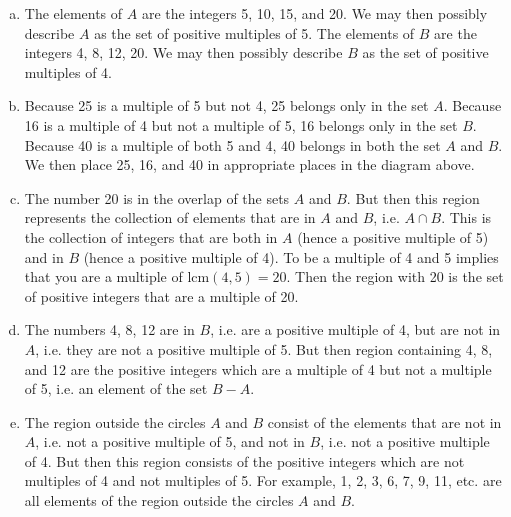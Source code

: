 \documentclass[11pt,letterpaper]{article}
\begin{document}
\sol 
\begin{enumerate}[(a)]
\item The elements of $A$ are the integers 5, 10, 15, and 20. We may then possibly describe $A$ as the set of positive multiples of 5. The elements of $B$ are the integers 4, 8, 12, 20. We may then possibly describe $B$ as the set of positive multiples of 4. \pspace

\item Because 25 is a multiple of 5 but not 4, 25 belongs only in the set $A$. Because 16 is a multiple of 4 but not a multiple of 5, 16 belongs only in the set $B$. Because 40 is a multiple of both 5 and 4, 40 belongs in both the set $A$ and $B$. We then place 25, 16, and 40 in appropriate places in the diagram above. 

\item The number 20 is in the overlap of the sets $A$ and $B$. But then this region represents the collection of elements that are in $A$ and $B$, i.e. $A \cap B$. This is the collection of integers that are both in $A$ (hence a positive multiple of 5) and in $B$ (hence a positive multiple of 4). To be a multiple of 4 and 5 implies that you are a multiple of $\text{lcm}(4, 5)= 20$. Then the region with 20 is the set of positive integers that are a multiple of 20. \pspace

\item The numbers 4, 8, 12 are in $B$, i.e. are a positive multiple of 4, but are not in $A$, i.e. they are not a positive multiple of 5. But then region containing 4, 8, and 12 are the positive integers which are a multiple of 4 but not a multiple of 5, i.e. an element of the set $B - A$. \pspace

\item The region outside the circles $A$ and $B$ consist of the elements that are not in $A$, i.e. not a positive multiple of 5, and not in $B$, i.e. not a positive multiple of 4. But then this region consists of the positive integers which are not multiples of 4 and not multiples of 5. For example, 1, 2, 3, 6, 7, 9, 11, etc. are all elements of the region outside the circles $A$ and $B$. 
\end{enumerate}



\newpage
\end{document}
